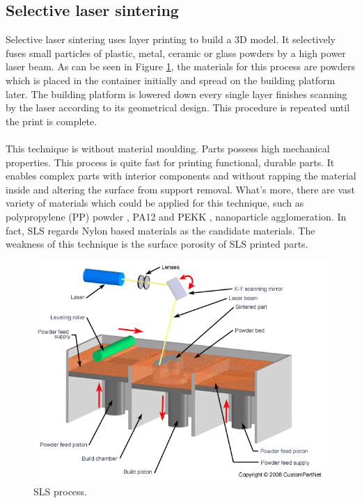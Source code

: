 \subsection{Selective laser sintering}

Selective laser sintering uses layer printing to build a 3D model\cite{hashmi2014comprehensive}. It selectively fuses small particles of plastic, metal, ceramic or glass powders by a high power laser beam\cite{jiang2013study}. As can be seen in Figure \ref{Fig:SLS}, the materials for this process are powders which is placed in the container initially and spread on the building platform later. The building platform is lowered down every single layer finishes scanning by the laser according to its geometrical design\cite{shahzad2013additive}\cite{shahzad2014additive}. This procedure is repeated until the print is complete\cite{ganeriwala2014multiphysics}. \\
\\
This technique is without material moulding. Parts possess high mechanical properties\cite{zhu2015investigation}. This process is quite fast for printing functional, durable parts. It enables complex parts with interior components and without rapping the material inside and altering the surface from support removal. What’s more, there are vast variety of materials which could be applied for this technique, such as polypropylene (PP) powder \cite{zhu2015investigation}, PA12 and PEKK \cite{peyre2015experimental}, nanoparticle agglomeration\cite{yuksel2016modeling}. In fact, SLS regards Nylon based materials as the candidate materials. The weakness of this technique is the surface porosity of SLS printed parts. 

\begin{figure}[htbp]
  \centering
  \includegraphics[scale=0.5]{Figs//SLS_process.png}
  \caption[SLS process]{\footnotesize SLS process.}
  \label{Fig:SLS}
\end{figure}

